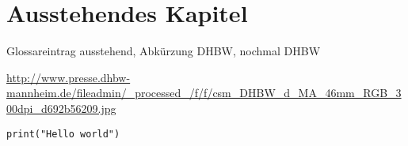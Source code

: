 \section{Ausstehendes Kapitel}

Glossareintrag \gls{ausstehend}, Abkürzung \ac{DHBW}, nochmal \ac{DHBW}

\begin{sloppypar}
\url{http://www.presse.dhbw-mannheim.de/fileadmin/_processed_/f/f/csm_DHBW_d_MA_46mm_RGB_300dpi_d692b56209.jpg} %
\end{sloppypar}

\begin{lstlisting}
print("Hello world")
\end{lstlisting}
